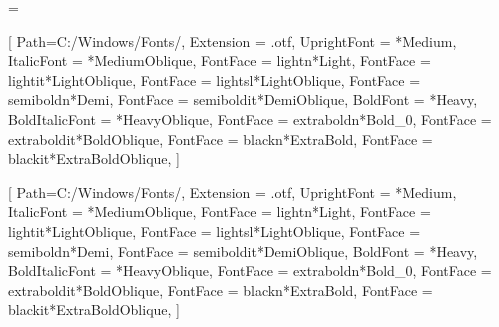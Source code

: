 

\emergencystretch=\maxdimen
{}
\relax
{}

\setcounter{tocdepth}{5}


\setmainlanguage[babelshorthands=true]{russian}

\setmainfont{Constantia}

\setsansfont{Futura PT}[
	Path=C:/Windows/Fonts/,
	Extension		=	.otf,
	UprightFont		=	*Medium,
	ItalicFont		=	*MediumOblique,
	FontFace		=	{light}{n}{*Light},
	FontFace		=	{light}{it}{*LightOblique},
	FontFace		=	{light}{sl}{*LightOblique},		
	FontFace		=	{semibold}{n}{*Demi},
	FontFace		=	{semibold}{it}{*DemiOblique},
	BoldFont		=	*Heavy,
	BoldItalicFont	=	*HeavyOblique,
	FontFace		=	{extrabold}{n}{*Bold_0},
	FontFace		=	{extrabold}{it}{*BoldOblique},
	FontFace		=	{black}{n}{*ExtraBold},
	FontFace		=	{black}{it}{*ExtraBoldOblique},
]

\newfontfamily{}

\newfontfamily{}[
	Path=C:/Windows/Fonts/,
	Extension		=	.otf,
	UprightFont		=	*Medium,
	ItalicFont		=	*MediumOblique,
	FontFace		=	{light}{n}{*Light},
	FontFace		=	{light}{it}{*LightOblique},
	FontFace		=	{light}{sl}{*LightOblique},		
	FontFace		=	{semibold}{n}{*Demi},
	FontFace		=	{semibold}{it}{*DemiOblique},
	BoldFont		=	*Heavy,
	BoldItalicFont	=	*HeavyOblique,
	FontFace		=	{extrabold}{n}{*Bold_0},
	FontFace		=	{extrabold}{it}{*BoldOblique},
	FontFace		=	{black}{n}{*ExtraBold},
	FontFace		=	{black}{it}{*ExtraBoldOblique},
]

\newfontfamily{}



